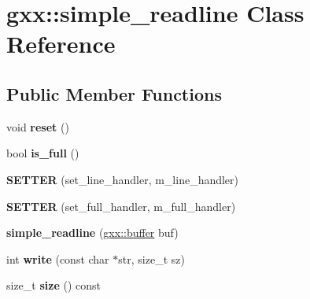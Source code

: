 \hypertarget{classgxx_1_1simple__readline}{}\section{gxx\+:\+:simple\+\_\+readline Class Reference}
\label{classgxx_1_1simple__readline}
\subsection*{Public Member Functions}
\begin{DoxyCompactItemize}
\item 
void {\bfseries reset} ()\hypertarget{classgxx_1_1simple__readline_a754af5a79210d4476a20c963f46375d0}{}\label{classgxx_1_1simple__readline_a754af5a79210d4476a20c963f46375d0}

\item 
bool {\bfseries is\+\_\+full} ()\hypertarget{classgxx_1_1simple__readline_a03d77db33e31fa4b3f4bbf7a030ce6a3}{}\label{classgxx_1_1simple__readline_a03d77db33e31fa4b3f4bbf7a030ce6a3}

\item 
{\bfseries S\+E\+T\+T\+ER} (set\+\_\+line\+\_\+handler, m\+\_\+line\+\_\+handler)\hypertarget{classgxx_1_1simple__readline_aa93ffaeb9b9627e8994afd68a65d4de5}{}\label{classgxx_1_1simple__readline_aa93ffaeb9b9627e8994afd68a65d4de5}

\item 
{\bfseries S\+E\+T\+T\+ER} (set\+\_\+full\+\_\+handler, m\+\_\+full\+\_\+handler)\hypertarget{classgxx_1_1simple__readline_af0ef4eb985b1c6adaccf2f23ac31cdfd}{}\label{classgxx_1_1simple__readline_af0ef4eb985b1c6adaccf2f23ac31cdfd}

\item 
{\bfseries simple\+\_\+readline} (\hyperlink{classgxx_1_1buffer}{gxx\+::buffer} buf)\hypertarget{classgxx_1_1simple__readline_adad25a2e0ce13cb0ce58aa0256ee862b}{}\label{classgxx_1_1simple__readline_adad25a2e0ce13cb0ce58aa0256ee862b}

\item 
int {\bfseries write} (const char $\ast$str, size\+\_\+t sz)\hypertarget{classgxx_1_1simple__readline_a4abcebb6adeab9e44efc7328eef6170a}{}\label{classgxx_1_1simple__readline_a4abcebb6adeab9e44efc7328eef6170a}

\item 
size\+\_\+t {\bfseries size} () const \hypertarget{classgxx_1_1simple__readline_a4de7adcdaa0aa32692a00435830ef5d4}{}\label{classgxx_1_1simple__readline_a4de7adcdaa0aa32692a00435830ef5d4}


\end{DoxyCompactItemize}
